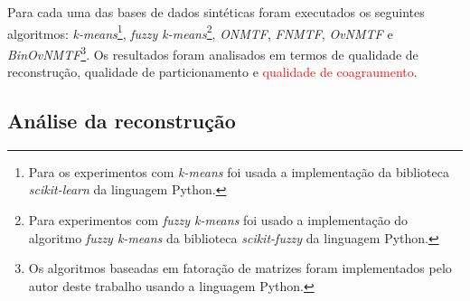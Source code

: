 \documentclass[
    12pt,                %
    oneside,            %
    a4paper,            %
    english,            %
    brazil                %
    ]{abntex2ppgsi}
\begin{document}


Para cada uma das bases de dados sintéticas foram executados os seguintes algoritmos: \textit{k-means}\footnote{Para os experimentos com \textit{k-means} foi usada a implementação da biblioteca \textit{scikit-learn} \cite{scikitLearn} da linguagem Python.}, \textit{fuzzy k-means}\footnote{Para experimentos com \textit{fuzzy k-means} foi usado a implementação do algoritmo \textit{fuzzy k-means} da biblioteca \textit{scikit-fuzzy} da linguagem Python.}, \textit{ONMTF}, \textit{FNMTF}, \textit{OvNMTF} e \textit{BinOvNMTF}\footnote{Os algoritmos baseadas em fatoração de matrizes foram implementados pelo autor deste trabalho usando a linguagem Python.}. Os resultados foram analisados em termos de qualidade de reconstrução, qualidade de particionamento e \textcolor{red}{qualidade de coagraumento}.

\subsection{Análise da reconstrução}
\end{document}
